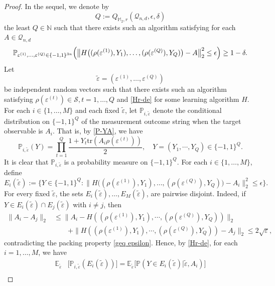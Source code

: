 \documentclass{amsbook}
\theoremstyle{definition}
\theoremstyle{remark}
\numberwithin{section}{chapter}
\numberwithin{equation}{chapter}
\newcommand{\M}{\mathbb{M}}
\newcommand{\1}{\mathbf{1}}
\begin{document}
\begin{proof}
In the sequel, we denote by
		\[
		Q:=Q_{\M_2,r}(\mathcal Q_{n,d},\epsilon,\delta)
		\]
		the least $Q\in\mathbb N$ such that there exists such an algorithm satisfying for each $A\in\mathcal Q_{n,d}$
		\begin{equation}\label{Hr-de}
			\mathbb{P}_{\varepsilon^{(1)},\dots,\varepsilon^{(Q)}\in\{-1,1\}^{3n}}\Bigl(
			\bigl\|H\bigl((\rho(\varepsilon^{(1)}),Y_1),\dots,(\rho(\varepsilon^{(Q)}),Y_Q)\bigr)-A\bigr\|_2^2\le \epsilon
			\Bigr)
			\ge 1-\delta.
		\end{equation}
Let
	\[\widetilde{\varepsilon}=(\varepsilon^{(1)},\dots,\varepsilon^{(Q)})\]
be  independent random vectors such that there exists such an algorithm satisfying  $ \rho(\varepsilon^{(t)})\in\mathcal S, t=1,\dots,Q$ and \eqref{Hr-de} for some
learning algorithm $H$. For each $i\in\{1,\dots,M\}$ and each fixed $\widetilde{\varepsilon}$, let $\mathbb P_{i,\widetilde{\varepsilon}}$
denote the conditional distribution on $\{-1,1\}^Q$ of the measurement outcome string when the target observable is $A_i$. That is,  by \eqref{P-YA},  we have
\[\mathbb P_{i,\widetilde{\varepsilon}}(Y)=\prod_{t=1}^Q\frac{1+Y_t\mathrm{tr}(A_i\rho(\varepsilon^{(t)}))}{2},\quad Y=(Y_1,\cdots,Y_Q)\in \{-1,1\}^Q.\]
It is clear that $\mathbb P_{i,\widetilde{\varepsilon}}$ is a probability measure on \(\{-1,1\}^Q\).
 For each $i\in\{1,\dots,M\}$, define
	\[
	E_i(\widetilde{\varepsilon}):=\{Y\in\{-1,1\}^Q:\|H\bigl((\rho(\varepsilon^{(1)}),Y_1),\dots,(\rho(\varepsilon^{(Q)}),Y_Q)\bigr)-A_i\|_2^2\leq \epsilon\}.
	\]
	For every fixed $\widetilde{\varepsilon}$,  the sets $	E_i(\widetilde{\varepsilon}),\dots,	E_M(\widetilde{\varepsilon})$,
	are pairwise disjoint. Indeed, if $Y\in E_i(\widetilde{\varepsilon})\cap E_j(\widetilde{\varepsilon})$ with
	$i\neq j$, then
	\begin{align*}
	\|A_i-A_j\|_2
	&\le \|A_i-H((\rho(\varepsilon^{(1)}),Y_1),\cdots,(\rho(\varepsilon^{(Q)}),Y_Q))\|_2\\
	&\qquad+\|H((\rho(\varepsilon^{(1)}),Y_1),\cdots,(\rho(\varepsilon^{(Q)}),Y_Q))-A_j\|_2
	\le 2\sqrt{\varepsilon},
	\end{align*}
	contradicting the packing property \eqref{geq epsilon}. Hence,  by \eqref{Hr-de}, for each \(i=1,\dots,M\), we have
	\begin{align*}
		\mathbb E_{\widetilde{\varepsilon}}&\big[\mathbb{P}_{i,\widetilde{\varepsilon}}(E_i(\widetilde{\varepsilon}))\big]=\mathbb E_{\widetilde{\varepsilon}}\big[\mathbb P(Y\in E_i(\widetilde{\varepsilon})|\widetilde{\varepsilon},A_i)\big]\\

\end{align*}
\end{proof}
\end{document}
